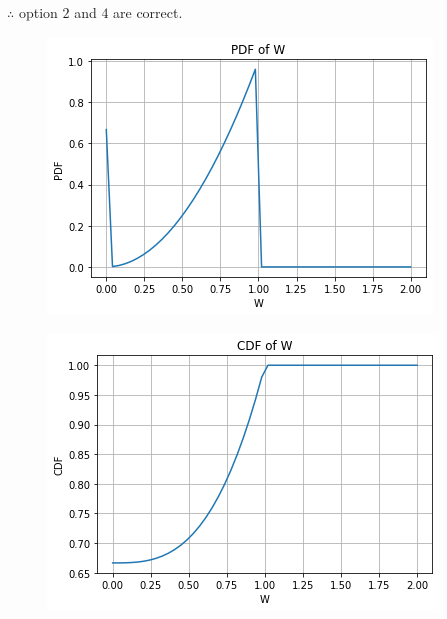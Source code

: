 \begin{enumerate}
$\therefore$ option $2$ and $4$ are correct.
\begin{figure}[htb!]
\begin{center}
\includegraphics[width=\columnwidth]{solutions/2013/june/70/figures/assignment8pdf.png}
\end{center}
\end{figure}

\begin{figure}[htb!]
\begin{center}
\includegraphics[width=\columnwidth]{solutions/2013/june/70/figures/assignment8cdf.png}
\end{center}
\end{figure}
\end{enumerate}
